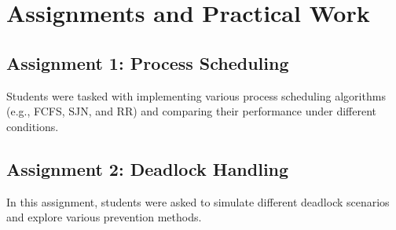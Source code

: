 \documentclass[12pt]{article}
\begin{document}
	\section{Assignments and Practical Work}
	\subsection{Assignment 1: Process Scheduling}
	Students were tasked with implementing various process scheduling algorithms (e.g., FCFS, SJN, and RR) and comparing their performance under different conditions.
	
	\subsection{Assignment 2: Deadlock Handling}
	In this assignment, students were asked to simulate different deadlock scenarios and explore various prevention methods.
	
\end{document}
